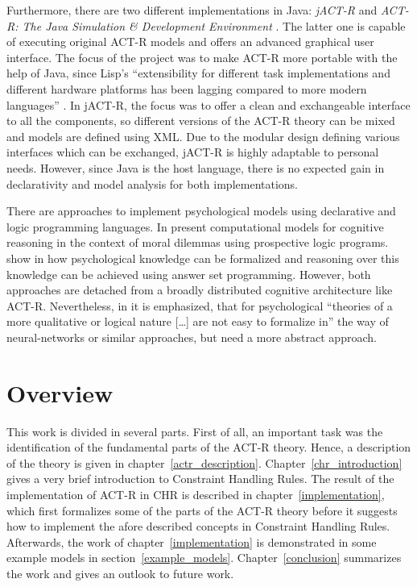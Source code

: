 Furthermore, there are two different implementations in Java: \emph{jACT-R} \cite{jactr} and \emph{ACT-R: The Java Simulation \& Development Environment} \cite{java_actr}. The latter one is capable of executing original ACT-R models and offers an advanced graphical user interface. The focus of the project was to make ACT-R more portable with the help of Java, since Lisp's ``extensibility for different task implementations and different hardware platforms has been lagging compared to more modern languages'' \cite{java_actr_benefits}. In jACT-R, the focus was to offer a clean and exchangeable interface to all the components, so different versions of the ACT-R theory can be mixed \cite{jactr_benefits} and models are defined using XML. Due to the modular design defining various interfaces which can be exchanged, jACT-R is highly adaptable to personal needs. However, since Java is the host language, there is no expected gain in declarativity and model analysis for both implementations.

There are approaches to implement psychological models using declarative and logic programming languages. In \cite{pereira_modellingmorality_2007} \citeauthor{pereira_modellingmorality_2007} present computational models for cognitive reasoning in the context of moral dilemmas using prospective logic programs. \citeauthor{balduccini_formalization_2010} show in \cite{balduccini_formalization_2010} how psychological knowledge can be formalized and reasoning over this knowledge can be achieved using answer set programming. However, both approaches are detached from a broadly distributed cognitive architecture like ACT-R. Nevertheless, in \cite[726]{balduccini_formalization_2010} it is emphasized, that for psychological ``theories of a more qualitative or logical nature [\dots] are not easy to formalize in'' the way of neural-networks or similar approaches, but need a more abstract approach.

\section{Overview}

This work is divided in several parts. First of all, an important task was the identification of the fundamental parts of the ACT-R theory. Hence, a description of the theory is given in chapter~\ref{actr_description}. Chapter~\ref{chr_introduction} gives a very brief introduction to Constraint Handling Rules. The result of the implementation of ACT-R in CHR is described in chapter~\ref{implementation}, which first formalizes some of the parts of the ACT-R theory before it suggests how to implement the afore described concepts in Constraint Handling Rules. Afterwards, the work of chapter~\ref{implementation} is demonstrated in some example models in section~\ref{example_models}. Chapter~\ref{conclusion} summarizes the work and gives an outlook to future work.

